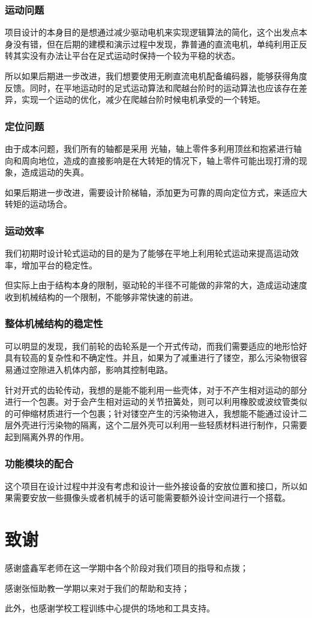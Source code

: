 \documentclass[12pt]{article}
\begin{document}
\begin{CJK}{UTF8}{gbsn}
\subsubsection{运动问题}
项目设计的本身目的是想通过减少驱动电机来实现逻辑算法的简化，这个出发点本身没有错，但在后期的建模和演示过程中发现，靠普通的直流电机，单纯利用正反转其实没有办法让平台在足式运动时保持一个较为平稳的状态。\par
        所以如果后期进一步改进，我们想要使用无刷直流电机配备编码器，能够获得角度反馈。同时，在平地运动时的足式运动算法和爬越台阶时的运动算法也应该存在差异，实现一个运动的优化，减少在爬越台阶时候电机承受的一个转矩。

\subsubsection{定位问题}
由于成本问题，我们所有的轴都是采用 光轴，轴上零件多利用顶丝和抱紧进行轴向和周向地位，造成的直接影响是在大转矩的情况下，轴上零件可能出现打滑的现象，造成运动的失真。\par
如果后期进一步改进，需要设计阶梯轴，添加更为可靠的周向定位方式，来适应大转矩的运动场合。

\subsubsection{运动效率}
我们初期时设计轮式运动的目的是为了能够在平地上利用轮式运动来提高运动效率，增加平台的稳定性。\par
但实际上由于结构本身的限制，驱动轮的半径不可能做的非常的大，造成运动速度收到机械结构的一个限制，不能够非常快速的前进。

\subsubsection{整体机械结构的稳定性}
可以明显的发现，我们前轮的齿轮系是一个开式传动，而我们需要适应的地形恰好具有较高的复杂性和不确定性。并且，如果为了减重进行了镂空，那么污染物很容易通过空隙进入机体内部，影响其控制电路。\par
针对开式的齿轮传动，我想的是能不能利用一些壳体，对于不产生相对运动的部分进行一个包裹。对于会产生相对运动的关节扭簧处，则可以利用橡胶或波纹管类似的可伸缩材质进行一个包裹；针对镂空产生的污染物进入，我想能不能通过设计二层外壳进行污染物的隔离，这个二层外壳可以利用一些轻质材料进行制作，只需要起到隔离外界的作用。

\subsubsection{功能模块的配合}
 这个项目在设计过程中并没有考虑和设计一些外接设备的安放位置和接口，所以如果需要安放一些摄像头或者机械手的话可能需要额外设计空间进行一个搭载。
 \newpage
\section{致谢}
感谢盛鑫军老师在这一学期中各个阶段对我们项目的指导和点拨；\par
感谢张恒助教一学期以来对于我们的帮助和支持；\par
此外，也感谢学校工程训练中心提供的场地和工具支持。
\end{CJK}
\end{document}

